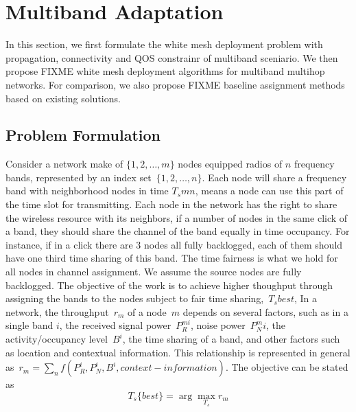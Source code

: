 \section{Multiband Adaptation}
\label{sec:model}

In this section, we first formulate the 
white mesh deployment problem
with propagation, connectivity and QOS constrainr of multiband sceniario.
We then propose {FIXME} white mesh deployment algorithms for multiband multihop networks. For comparison, we also propose {FIXME} baseline assignment methods based on existing solutions.

\subsection{Problem Formulation}
Consider a network make of $\{1,2,\ldots,m\}$ nodes equipped radios of $n$ frequency bands, represented by an index set~$\{1,2, \ldots, n\}$. 
Each node will share a frequency band with neighborhood nodes in time $T_s{mn}$, means a node can use this part of the time slot for transmitting. Each node in the network has the right to share the wireless resource with its neighbors, if a number of nodes in the same click of a band, they should share the channel of the band equally in time occupancy. For instance, if in a click there are 3 nodes all fully backlogged, each of them should have one third time sharing of this band. The time fairness is what we hold for all nodes in channel assignment. 
We assume the source nodes are fully backlogged. 
The objective of the work is to achieve higher thoughput through assigning the bands to the nodes subject to fair time sharing,~$T_s{best}$,
In a network, the throughput~$r_m$ of a node~$m$ depends on several factors, such as in a single band $i$, the received signal power~$P_R^{mi}$, noise power~$P_N^mi$, the activity/occupancy level~$B^i$, the time sharing of a band, and other factors such as location and contextual information. 
This relationship is represented in general as~$r_m =\sum_n{f(P_R^i,P_N^i,B^i,context-information)}$. The objective can be stated as
\begin{equation}
T_s\{best\}= \arg \max_{T_s} r_m 
\end{equation}


